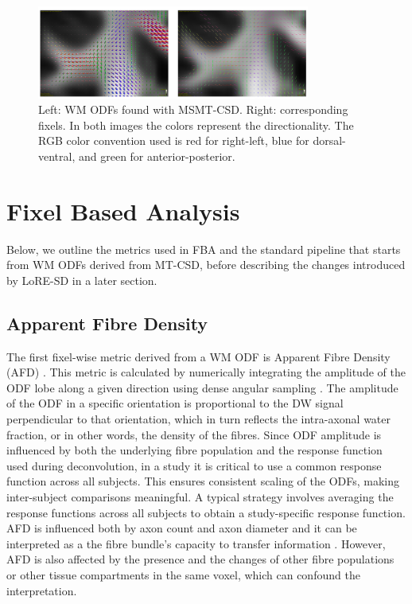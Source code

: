 \begin{figure}[h]
  \centering
  \includegraphics[width=0.8\textwidth]{Images/fixel.png} %
  \caption{Left: WM ODFs found with MSMT-CSD. Right: corresponding fixels. In both images the colors represent the directionality. The RGB color convention used is red for right-left, blue for dorsal-ventral, and green for anterior-posterior.}
  \label{fig:fixel}
\end{figure}

\section{Fixel Based Analysis}
\label{sec:fba}
Below, we outline the metrics used in FBA and the standard pipeline that starts from WM ODFs derived from MT-CSD, before describing the changes introduced by LoRE-SD in a later section.

\subsection{Apparent Fibre Density}
The first fixel-wise metric derived from a WM ODF is Apparent Fibre Density (AFD) \cite{Raffelt2012}. This metric is calculated by numerically integrating the amplitude of the ODF lobe along a given direction using dense angular sampling \cite{Smith2013}. The amplitude of the ODF in a specific orientation is proportional to the DW signal perpendicular to that orientation, which in turn reflects the intra-axonal water fraction, or in other words, the density of the fibres.
Since ODF amplitude is influenced by both the underlying fibre population and the response function used during deconvolution, in a study it is critical to use a common response function across all subjects. This ensures consistent scaling of the ODFs, making inter-subject comparisons meaningful. A typical strategy involves averaging the response functions across all subjects to obtain a study-specific response function.
AFD is influenced both by axon count and axon diameter \cite{Dhollander2021} and it can be interpreted as a the fibre bundle's capacity to transfer information \cite{Raffelt2012}. However, AFD is also affected by the presence and the changes of other fibre populations or other tissue compartments in the same voxel, which can confound the interpretation.

